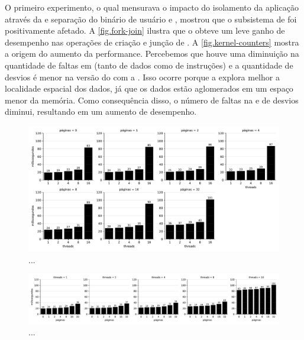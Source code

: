 O primeiro experimento, o qual mensurava o impacto do isolamento da aplicação através da \uarea e separação do binário de usuário e , mostrou que o subsistema de \threads foi positivamente afetado. A \autoref{fig.fork-join} ilustra que o \nanvix obteve um leve ganho de desempenho nas operações de criação e junção de \threads. A \autoref{fig.kernel-counters} mostra a origem do aumento da performance. Percebemos que houve uma diminuição na quantidade de faltas em \cache (tanto de dados como de instruções) e a quantidade de desvios é menor na versão do \nanvix com a \uarea. Isso ocorre porque a \uarea explora melhor a localidade espacial dos dados, já que os dados estão aglomerados em um espaço menor da memória. Como consequência disso, o número de faltas na \cache e de desvios diminui, resultando em um aumento de desempenho.


\begin{figure}[tb]
    \centering
    \includegraphics[width=\linewidth]{content/images/multiple_threads_pages.pdf}
    \caption{...}
    \label{fig.mtpages}
\end{figure}

\begin{figure}[tb]
    \centering
    \includegraphics[width=\linewidth]{content/images/multiple_threads_threads.pdf}
    \caption{...}
    \label{fig.mtthreads}
\end{figure}
